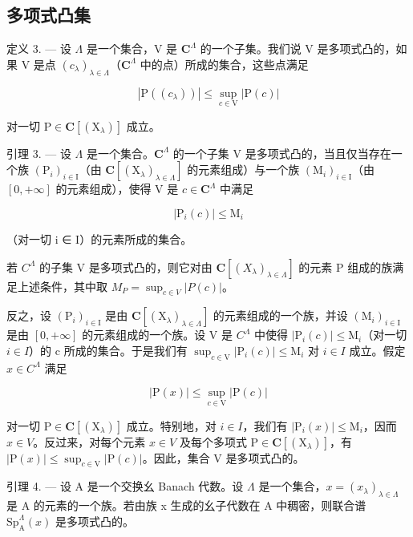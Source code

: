 \subsection{多项式凸集}

定义 3. --- 设 \(\Lambda\) 是一个集合，V 是 \(\mathbf{C}^{\Lambda}\) 的一个子集。我们说 V 是多项式凸的，如果 V 是点 \((c_{\lambda})_{\lambda \in \Lambda}\)（\(\mathbf{C}^{\Lambda}\) 中的点）所成的集合，这些点满足

\[
| \mathrm{P} ((c _ {\lambda})) | \leqslant \sup _ {c \in \mathrm{V}} | \mathrm{P} (c) |
\]

对一切 \(\mathrm{P}\in \mathbf{C}[(\mathrm{X}_{\lambda})]\) 成立。

引理 3. --- 设 \(\Lambda\) 是一个集合。\(\mathbf{C}^{\Lambda}\) 的一个子集 V 是多项式凸的，当且仅当存在一个族 \((\mathrm{P}_i)_{i\in \mathrm{I}}\)（由 \(\mathbf{C}[(\mathrm{X}_{\lambda})_{\lambda \in \Lambda}]\) 的元素组成）与一个族 \((\mathrm{M}_i)_{i\in \mathrm{I}}\)（由 \([0, +\infty]\) 的元素组成），使得 V 是 \(c\in \mathbf{C}^{\Lambda}\) 中满足

\[
| \mathrm{P} _ {i} (c) | \leqslant \mathrm{M} _ {i}
\]

（对一切 i ∈ I）的元素所成的集合。

若 \(C^{\Lambda}\) 的子集 V 是多项式凸的，则它对由 \(\mathbf{C}[(X_{\lambda})_{\lambda\in\Lambda}]\) 的元素 P 组成的族满足上述条件，其中取 \(M_{P}=\sup_{c\in V}|P(c)|\)。

反之，设 \((\mathrm{P}_{i})_{i\in\mathrm{I}}\) 是由 \(\mathbf{C}[(\mathrm{X}_{\lambda})_{\lambda\in\Lambda}]\) 的元素组成的一个族，并设 \((\mathrm{M}_{i})_{i\in\mathrm{I}}\) 是由 \([0,+\infty]\) 的元素组成的一个族。设 V 是 \(C^{\Lambda}\) 中使得 \(|\mathrm{P}_{i}(c)|\leqslant\mathrm{M}_{i}\)（对一切 \(i\in I\)）的 c 所成的集合。于是我们有 \(\sup_{c\in\mathrm{V}}|\mathrm{P}_{i}(c)|\leqslant\mathrm{M}_{i}\) 对 \(i\in I\) 成立。假定 \(x\in C^{\Lambda}\) 满足

\[
| \mathrm{P} (x) | \leqslant \sup _ {c \in \mathrm{V}} | \mathrm{P} (c) |
\]

对一切 \(\mathrm{P}\in\mathbf{C}[(\mathrm{X}_{\lambda})]\) 成立。特别地，对 \(i\in I\)，我们有 \(|\mathrm{P}_{i}(x)|\leqslant\mathrm{M}_{i}\)，因而 \(x\in V\)。反过来，对每个元素 \(x\in V\) 及每个多项式 \(\mathrm{P}\in\mathbf{C}[(\mathrm{X}_{\lambda})]\)，有 \(|\mathrm{P}(x)|\leqslant\sup_{c\in\mathrm{V}}|\mathrm{P}(c)|\)。因此，集合 V 是多项式凸的。

引理 4. --- 设 A 是一个交换幺 Banach 代数。设 \(\Lambda\) 是一个集合，\(x = (x_{\lambda})_{\lambda \in \Lambda}\) 是 A 的元素的一个族。若由族 x 生成的幺子代数在 A 中稠密，则联合谱 \(\mathrm{Sp}_{\mathrm{A}}^{\Lambda}(x)\) 是多项式凸的。

